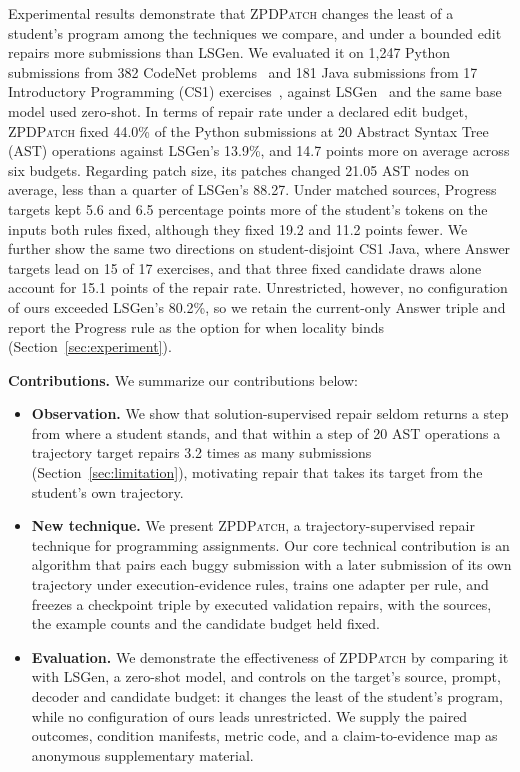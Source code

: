 \documentclass[10pt,conference]{IEEEtran}
\begin{document}
Experimental results demonstrate that \textsc{ZPDPatch} changes the least of a student's program among the techniques we compare, and under a bounded edit repairs more submissions than LSGen. We evaluated it on 1,247 Python submissions from 382 CodeNet problems~\cite{puri2021codenet} and 181 Java submissions from 17 Introductory Programming (CS1) exercises~\cite{duan2024tiktoc}, against LSGen~\cite{dai2026learner} and the same base model used zero-shot. In terms of repair rate under a declared edit budget, \textsc{ZPDPatch} fixed 44.0\% of the Python submissions at 20 Abstract Syntax Tree (AST) operations against LSGen's 13.9\%, and 14.7 points more on average across six budgets. Regarding patch size, its patches changed 21.05 AST nodes on average, less than a quarter of LSGen's 88.27. Under matched sources, Progress targets kept 5.6 and 6.5 percentage points more of the student's tokens on the inputs both rules fixed, although they fixed 19.2 and 11.2 points fewer. We further show the same two directions on student-disjoint CS1 Java, where Answer targets lead on 15 of 17 exercises, and that three fixed candidate draws alone account for 15.1 points of the repair rate. Unrestricted, however, no configuration of ours exceeded LSGen's 80.2\%, so we retain the current-only Answer triple and report the Progress rule as the option for when locality binds (Section~\ref{sec:experiment}).

\noindent\textbf{Contributions.} We summarize our contributions below:
\begin{itemize}
\item \textbf{Observation.} We show that solution-supervised repair seldom returns a step from where a student stands, and that within a step of 20 AST operations a trajectory target repairs 3.2 times as many submissions (Section~\ref{sec:limitation}), motivating repair that takes its target from the student's own trajectory.
\item \textbf{New technique.} We present \textsc{ZPDPatch}, a trajectory-supervised repair technique for programming assignments. Our core technical contribution is an algorithm that pairs each buggy submission with a later submission of its own trajectory under execution-evidence rules, trains one adapter per rule, and freezes a checkpoint triple by executed validation repairs, with the sources, the example counts and the candidate budget held fixed.
\item \textbf{Evaluation.} We demonstrate the effectiveness of \textsc{ZPDPatch} by comparing it with LSGen, a zero-shot model, and controls on the target's source, prompt, decoder and candidate budget: it changes the least of the student's program, while no configuration of ours leads unrestricted. We supply the paired outcomes, condition manifests, metric code, and a claim-to-evidence map as anonymous supplementary material.
\end{itemize}
\end{document}
